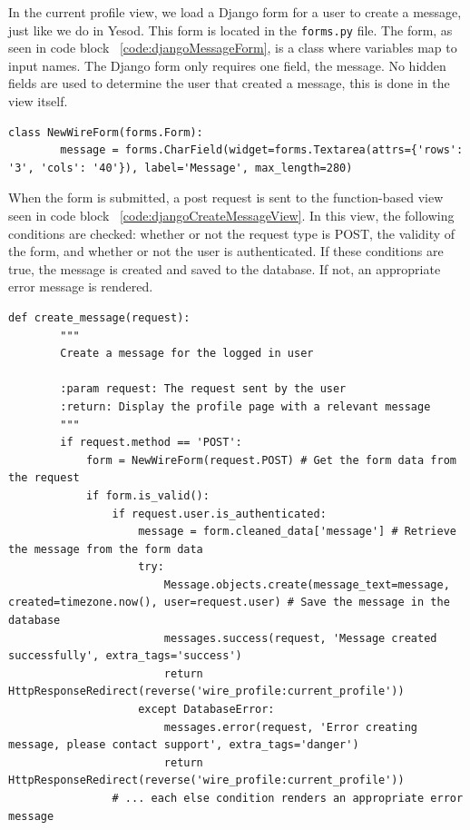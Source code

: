 In the current profile view, we load a Django form for a user to create a message,
just like we do in Yesod. This form is located in the \texttt{forms.py} file. The
form, as seen in code block ~\ref{code:djangoMessageForm}, is a class where variables map
to input names. The Django form only requires one field, the message. No hidden
fields are used to determine the user that created a message, this is done in
the view itself.

\begin{lstlisting}[caption={Django message form},label={code:djangoMessageForm}]
	class NewWireForm(forms.Form):
		message = forms.CharField(widget=forms.Textarea(attrs={'rows': '3', 'cols': '40'}), label='Message', max_length=280)
\end{lstlisting}

When the form is submitted, a post request is sent to the function-based view
seen in code block ~\ref{code:djangoCreateMessageView}. In this view, the following
conditions are checked: whether or not the request type is POST, the validity of the
form, and whether or not the user is authenticated. If these conditions are true,
the message is created and saved to the database. If not, an appropriate error
message is rendered.

\begin{lstlisting}[caption={Function-based create message view},label={code:djangoCreateMessageView}]
	def create_message(request):
		"""
		Create a message for the logged in user

		:param request: The request sent by the user
		:return: Display the profile page with a relevant message
		"""
		if request.method == 'POST':
			form = NewWireForm(request.POST) # Get the form data from the request
			if form.is_valid():
				if request.user.is_authenticated:
					message = form.cleaned_data['message'] # Retrieve the message from the form data
					try:
						Message.objects.create(message_text=message, created=timezone.now(), user=request.user) # Save the message in the database
						messages.success(request, 'Message created successfully', extra_tags='success')
						return HttpResponseRedirect(reverse('wire_profile:current_profile'))
					except DatabaseError:
						messages.error(request, 'Error creating message, please contact support', extra_tags='danger')
						return HttpResponseRedirect(reverse('wire_profile:current_profile'))
				# ... each else condition renders an appropriate error message
\end{lstlisting}

